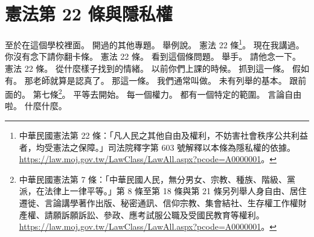 \section{憲法第 22 條與隱私權}

\hypertarget{c01:cue:654}{}至於在這個學校裡面。
\hypertarget{c01:cue:655}{}開過的其他專題。
\hypertarget{c01:cue:656}{}舉例說。
\hypertarget{c01:cue:657}{}憲法 22 條\footnote{中華民國憲法第 22 條：「凡人民之其他自由及權利，不妨害社會秩序公共利益者，均受憲法之保障。」司法院釋字第 603 號解釋以本條為隱私權的依據。\url{https://law.moj.gov.tw/LawClass/LawAll.aspx?pcode=A0000001}。}。
\hypertarget{c01:cue:658}{}現在我講過。
\hypertarget{c01:cue:659}{}你沒有念下請你翻卡條。
\hypertarget{c01:cue:660}{}憲法 22 條。
\hypertarget{c01:cue:661}{}看到這個條問題。
\hypertarget{c01:cue:662}{}舉手。
\hypertarget{c01:cue:663}{}請他念一下。
\hypertarget{c01:cue:664}{}憲法 22 條。
\hypertarget{c01:cue:665}{}從什麼樣子找到的情緒。
\hypertarget{c01:cue:666}{}以前你們上課的時候。
\hypertarget{c01:cue:667}{}抓到這一條。
\hypertarget{c01:cue:668}{}假如有。
\hypertarget{c01:cue:669}{}那老師就算是認真了。
\hypertarget{c01:cue:670}{}那這一條。
\hypertarget{c01:cue:671}{}我們通常叫做。
\hypertarget{c01:cue:672}{}未有列舉的基本。
\hypertarget{c01:cue:673}{}跟前面的。
\hypertarget{c01:cue:674}{}第七條\footnote{中華民國憲法第 7 條：「中華民國人民，無分男女、宗教、種族、階級、黨派，在法律上一律平等。」第 8 條至第 18 條與第 21 條另列舉人身自由、居住遷徙、言論講學著作出版、秘密通訊、信仰宗教、集會結社、生存權工作權財產權、請願訴願訴訟、參政、應考試服公職及受國民教育等權利。\url{https://law.moj.gov.tw/LawClass/LawAll.aspx?pcode=A0000001}。}。
\hypertarget{c01:cue:675}{}平等去開始。
\hypertarget{c01:cue:676}{}每一個權力。
\hypertarget{c01:cue:677}{}都有一個特定的範圍。
\hypertarget{c01:cue:678}{}言論自由啦。
\hypertarget{c01:cue:679}{}什麼什麼。
